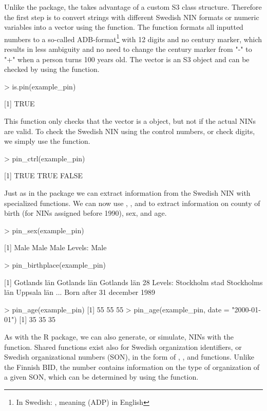 Unlike the  package, the  takes advantage of a custom S3 class structure. Therefore the first step is to convert strings with different Swedish NIN formats or numeric variables into a  vector using the  function. The  function formats all inputted numbers to a so-called ADB-format\footnote{In Swedish: , meaning  (ADP) in English} with 12 digits and no century marker, which results in less ambiguity and no need to change the century marker from "-" to "+" when a person turns 100 years old. The  vector is an S3 object and can be checked by using the  function.

\begin{example}
  > is.pin(example_pin)

  [1] TRUE
\end{example}

This function only checks that the vector is a  object, but not if the actual NINs are valid. To check the Swedish NIN using the control numbers, or check digits, we simply use the  function.

\begin{example}
  > pin_ctrl(example_pin)

  [1]  TRUE  TRUE FALSE
\end{example}

Just as in the  package we can extract information from the Swedish NIN with specialized functions. We can now use , , and  to extract information on county of birth (for NINs assigned before 1990), sex, and age.

\begin{example}
  > pin_sex(example_pin)
   
  [1] Male Male Male
  Levels: Male

  > pin_birthplace(example_pin)
   
  [1] Gotlands län Gotlands län Gotlands län
  28 Levels: Stockholm stad Stockholms län Uppsala län ... Born after 31 december 1989

  > pin_age(example_pin)
  [1] 55 55 55
  > pin_age(example_pin, date = "2000-01-01")
  [1] 35 35 35
\end{example}

As with the  R package, we can also generate, or simulate, NINs with the  function. Shared functions exist also for Swedish organization identifiers, or Swedish organizational numbers (SON), in the form of , , and  functions. Unlike the Finnish BID, the  number contains information on the type of organization of a given SON, which can be determined by using the  function.

